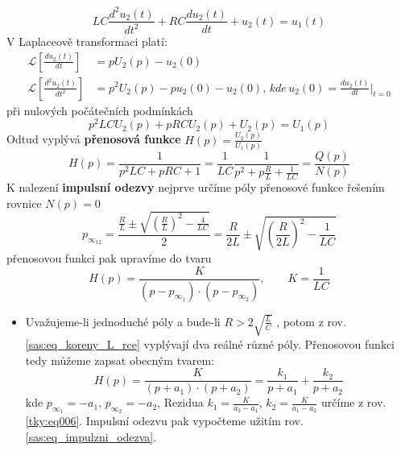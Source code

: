 \begin{example}
  \begin{equation}\label{sas:eq_dif_RLC_II_r}
    LC\frac{d^2u_2(t)}{dt^2}+RC\frac{du_2(t)}{dt}+u_2(t)=u_1(t)
  \end{equation}
  V Laplaceově transformaci platí:
  \begin{align*}
    \mathcal{L}\left[\frac{du_2(t)}{dt}\right]     &= pU_2(p)-u_2(0) \\
    \mathcal{L}\left[\frac{d^2u_2(t)}{dt^2}\right] &= p^2U_2(p)-pu_2(0)-u_2(0),\,kde\,u_2(0)=
    \frac{du_2(t)}{dt}|_{t=0}
  \end{align*}
  při nulových počátečních podmínkách
  \begin{equation}\label{sas:eq_L_RLC_rce}
    p^2LCU_2(p)+pRCU_2(p)+U_2(p)=U_1(p)
  \end{equation}
  Odtud vyplývá \textbf{přenosová funkce} $H(p)=\frac{U_2(p)}{U_1(p)}$
  \begin{equation}\label{sas:eq_Hp_RLC}
    H(p)=\frac{1}{p^2LC+pRC+1}
        =\frac{1}{LC}\frac{1}{p^2+p\frac{R}{L}+\frac{1}{LC}}=\frac{Q(p)}{N(p)}
  \end{equation}
  K nalezení \textbf{impulsní odezvy} nejprve určíme póly přenosové funkce řešením rovnice
  $N(p)=0$
  \begin{equation}\label{sas:eq_koreny_L_rce}
    p_{\infty_{12}}=\frac{\frac{R}{L}\pm\sqrt{\left(\frac{R}{L}\right)^2-\frac{4}{LC}}}{2}
    =\frac{R}{2L}\pm\sqrt{\left(\frac{R}{2L}\right)^2-\frac{1}{LC}}
  \end{equation}
  přenosovou funkci pak upravíme do tvaru
  \begin{equation}\label{sas:eq_Hp_forma}
    H(p)=\frac{K}{(p-p_{\infty_1})\cdot(p-p_{\infty_2})}, \qquad K=\frac{1}{LC}
  \end{equation}
  \begin{itemize}
    \item Uvažujeme-li jednoduché póly a bude-li $R>2\sqrt{\frac{L}{C}}$ , potom z  rov.
          \ref{sas:eq_koreny_L_rce} vyplývají dva reálné různé póly. Přenosovou funkci tedy můžeme
          zapsat obecným tvarem:
          \begin{equation}\label{sas:eq_Hp_forma_2}
            H(p)=\frac{K}{(p+a_1)\cdot(p+a_2)}=\frac{k_1}{p+a_1}+\frac{k_2}{p+a_2}
          \end{equation}
          kde $p_{\infty_1}=-a_1,\, p_{\infty_2}=-a_2$, Rezidua  $k_1=\frac{K}{a_2-a_1}$,
          $k_2=\frac{K}{a_1-a_2}$ určíme z rov. \ref{tky:eq006}. Impulsní odezvu pak
          vypočteme užitím rov. \ref{sas:eq_impulzni_odezva}.
          \begin{equation}\label{sas:eq_ht1}

\end{equation}
\end{itemize}
\end{example}
